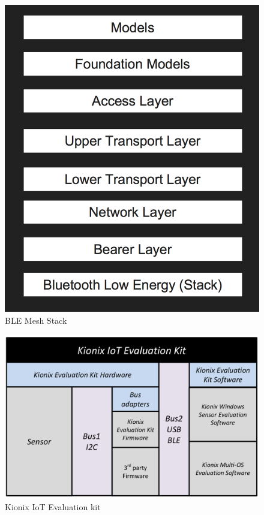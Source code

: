 \documentclass[11pt, a4paper]{article}
\begin{document}
 	\begin{figure}[!h]
	
	\begin{adjustwidth}{-1.5cm}{}
		\begin{center}
			\includegraphics[scale=0.40]{Images/stack.png}
		\end{center}
	\end{adjustwidth}
	\caption{BLE Mesh Stack}
\end{figure}

 	\begin{figure}[!h]
	
	\begin{adjustwidth}{-1.5cm}{}
		\begin{center}
			\includegraphics[scale=0.50]{Images/rokistack.png}
		\end{center}
	\end{adjustwidth}
	\caption{Kionix IoT Evaluation kit}
	\label{kionixstack}
\end{figure}
\end{document}
